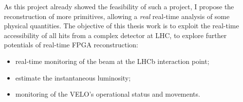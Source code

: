 As this project already showed the feasibility of such a project, I propose the reconstruction of more primitives, allowing a \textit{real} real-time analysis of some physical quantities. 
The objective of this thesis work is to exploit the real-time accessibility of all hits from a complex detector at LHC, to explore further potentials of real-time FPGA reconstruction: 
\begin{itemize}
\item real-time monitoring of the beam at the LHCb interaction point;
\item estimate the instantaneous luminosity;
\item monitoring of the VELO's operational status and movements.
\end{itemize}

